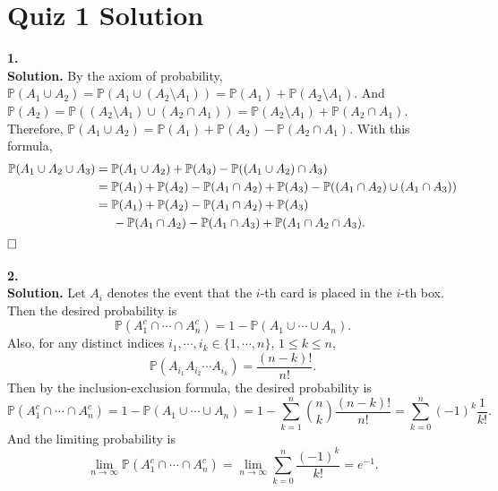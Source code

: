 \documentclass[12pt]{article}
\begin{document}
\section*{Quiz 1 Solution}
\textbf{1.}\\
\textbf{Solution.} By the axiom of probability, $\mathbb{P}(A_1\cup A_2)=\mathbb{P}(A_1\cup(A_2\setminus A_1))=\mathbb{P}(A_1)+\mathbb{P}(A_2\setminus A_1)$. And $\mathbb{P}(A_2)=\mathbb{P}((A_2\setminus A_1)\cup(A_2\cap A_1))=\mathbb{P}(A_2\setminus A_1)+\mathbb{P}(A_2\cap A_1)$. Therefore, $\mathbb{P}(A_1\cup A_2)=\mathbb{P}(A_1)+\mathbb{P}(A_2)-\mathbb{P}(A_2\cap A_1)$. With this formula,
\begin{equation*}
\begin{aligned}
\mathbb{P}(A_1\cup A_2\cup A_3) &= \mathbb{P}(A_1\cup A_2)+\mathbb{P}(A_3)-\mathbb{P}((A_1\cup A_2)\cap A_3) \\&
=\mathbb{P}(A_1)+\mathbb{P}(A_2)-\mathbb{P}(A_1\cap A_2)+\mathbb{P}(A_3)-\mathbb{P}((A_1\cap A_2)\cup(A_1\cap A_3)) \\&
=\mathbb{P}(A_1)+\mathbb{P}(A_2)-\mathbb{P}(A_1\cap A_2)+\mathbb{P}(A_3)
\\&
\hspace{5mm}-\mathbb{P}(A_1\cap A_2)-\mathbb{P}(A_1\cap A_3)+\mathbb{P}(A_1\cap A_2\cap A_3).
\end{aligned}
\end{equation*}
$\hspace{\fill}\square$
\\ \\
\textbf{2.} \\
\textbf{Solution.} Let $A_i$ denotes the event that the $i$-th card is placed in the $i$-th box. Then the desired probability is
\begin{equation*}
\mathbb{P}(A_1^c\cap\cdots\cap A_n^c)=1-\mathbb{P}(A_1\cup\cdots\cup A_n).
\end{equation*}
Also, for any distinct indices $i_1,\cdots,i_k\in\{1,\cdots,n\}$, $1\leq k\leq n$,
\begin{equation*}
\mathbb{P}(A_{i_1}A_{i_2}\cdots A_{i_k})=\frac{(n-k)!}{n!}.
\end{equation*}
Then by the inclusion-exclusion formula, the desired probability is
\begin{equation*}
\mathbb{P}(A_1^c\cap\cdots\cap A_n^c)=1-\mathbb{P}(A_1\cup\cdots\cup A_n)=1-\sum_{k=1}^n\binom{n}{k}\frac{(n-k)!}{n!}=\sum_{k=0}^n(-1)^k\frac{1}{k!}.
\end{equation*}
And the limiting probability is
\begin{equation*}
\lim_{n\rightarrow\infty}\mathbb{P}(A_1^c\cap\cdots\cap A_n^c)=\lim_{n\rightarrow\infty}\sum_{k=0}^n\frac{(-1)^k}{k!}=e^{-1}.
\end{equation*}
\end{document}
